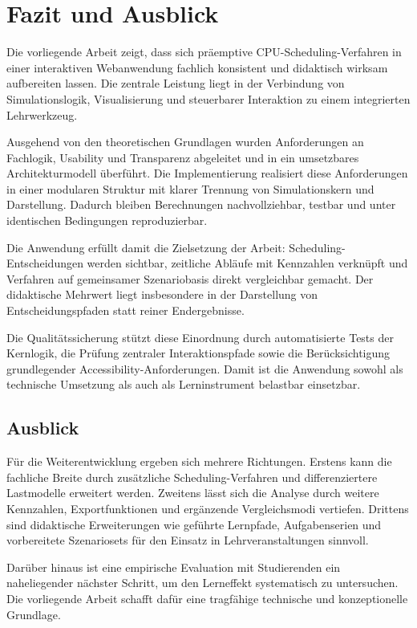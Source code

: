 \chapter{Fazit und Ausblick}

Die vorliegende Arbeit zeigt, dass sich präemptive CPU-Scheduling-Verfahren in einer interaktiven Webanwendung fachlich konsistent und didaktisch wirksam aufbereiten lassen. Die zentrale Leistung liegt in der Verbindung von Simulationslogik, Visualisierung und steuerbarer Interaktion zu einem integrierten Lehrwerkzeug.

Ausgehend von den theoretischen Grundlagen wurden Anforderungen an Fachlogik, Usability und Transparenz abgeleitet und in ein umsetzbares Architekturmodell überführt. Die Implementierung realisiert diese Anforderungen in einer modularen Struktur mit klarer Trennung von Simulationskern und Darstellung. Dadurch bleiben Berechnungen nachvollziehbar, testbar und unter identischen Bedingungen reproduzierbar.

Die Anwendung erfüllt damit die Zielsetzung der Arbeit: Scheduling-Entscheidungen werden sichtbar, zeitliche Abläufe mit Kennzahlen verknüpft und Verfahren auf gemeinsamer Szenariobasis direkt vergleichbar gemacht. Der didaktische Mehrwert liegt insbesondere in der Darstellung von Entscheidungspfaden statt reiner Endergebnisse.

Die Qualitätssicherung stützt diese Einordnung durch automatisierte Tests der Kernlogik, die Prüfung zentraler Interaktionspfade sowie die Berücksichtigung grundlegender Accessibility-Anforderungen. Damit ist die Anwendung sowohl als technische Umsetzung als auch als Lerninstrument belastbar einsetzbar.

\section{Ausblick}

Für die Weiterentwicklung ergeben sich mehrere Richtungen. Erstens kann die fachliche Breite durch zusätzliche Scheduling-Verfahren und differenziertere Lastmodelle erweitert werden. Zweitens lässt sich die Analyse durch weitere Kennzahlen, Exportfunktionen und ergänzende Vergleichsmodi vertiefen. Drittens sind didaktische Erweiterungen wie geführte Lernpfade, Aufgabenserien und vorbereitete Szenariosets für den Einsatz in Lehrveranstaltungen sinnvoll.

Darüber hinaus ist eine empirische Evaluation mit Studierenden ein naheliegender nächster Schritt, um den Lerneffekt systematisch zu untersuchen. Die vorliegende Arbeit schafft dafür eine tragfähige technische und konzeptionelle Grundlage.
